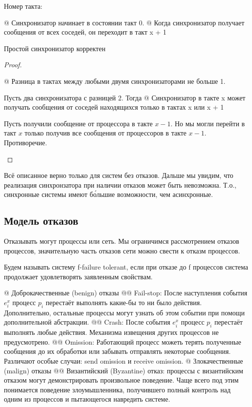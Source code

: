 Номер такта:
\begin{el}[ul]
@ Синхронизатор начинает в состоянии такт 0.
@ Когда синхронизатор получает сообщения от всех соседей, он
переходит в такт x + 1
\end{el}
\begin{stmt}
Простой синхронизатор корректен
\end{stmt}
\begin{proof}
\begin{el}[ul]
@ Разница в тактах между любыми двумя синхронизаторами не
больше 1. 

 Пусть два синхронизатора с разницей 2. Тогда 
@ Синхронизатор в такте x может получать сообщения от соседей
находящихся только в тактах x или x + 1

 Пусть получили сообщение от процессора в такте $x-1$. Но мы могли перейти в такт $x$ только получив все сообщения от процессоров в такте $x-1$. Противоречие.\qedhere
\end{el}
\end{proof}

\begin{note}
Всё описанное верно только для систем без отказов. Дальше мы увидим, что реализация синхронзатора при наличии отказов может быть невозможна. Т.о., синхронные системы имеют б\'{о}льшие возможности, чем асинхронные.
\end{note}

\subsection{Модель отказов}
Отказывать могут процессы или сеть. Мы ограничимся рассмотрением отказов процессов, значительную часть отказов сети можно свести к отказм процессов.

Будем называть систему f-failure tolerant, если при отказе до f процессов система продолжает удовлетворять заявленным свойствам.

\begin{el}[ul]
@ Доброкачественные (benign) отказы
@@ Fail-stop: После наступления события $e_i^x$ процесс $p_i$ перестаёт выполнять какие-бы то ни было действия. Дополнительно, остальные процессы могут узнать об этом событии при помощи дополнительной абстракции.
@@ Crash: После события $e_i^x$ процесс $p_i$ перестаёт выполнять любые действия. Механизма извещения других процессов не предусмотрено.
@@ Omission: Работающий процесс можеть терять полученные сообщения до их обработки или забывать отправлять некоторые сообщения. Различают особые случаи: send omission и receive omission.
@ Злокачественные (malign) отказы
@@ Византийский (Byzantine) отказ: процессы с византийским отказом могут демонстрировать произвольное поведение. Чаще всего под этим понимается поведение злоумышленника, получившего полный контроль над одним из процессов и пытающегося навредить системе.
\end{el}

